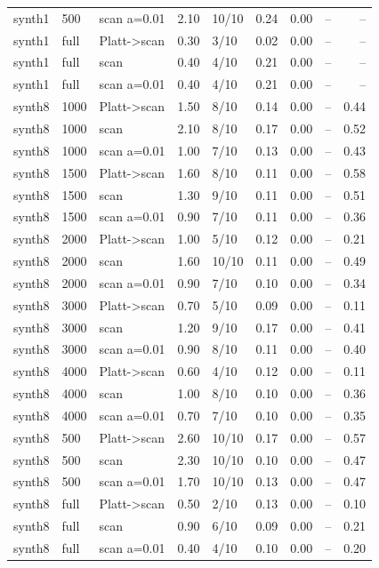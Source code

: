 \begin{tabular}{lllrlrrrr}
synth1 & 500 & scan a=0.01 & 2.10 & 10/10 & 0.24 & 0.00 & -- & -- \\
synth1 & full & Platt->scan & 0.30 & 3/10 & 0.02 & 0.00 & -- & -- \\
synth1 & full & scan & 0.40 & 4/10 & 0.21 & 0.00 & -- & -- \\
synth1 & full & scan a=0.01 & 0.40 & 4/10 & 0.21 & 0.00 & -- & -- \\
synth8 & 1000 & Platt->scan & 1.50 & 8/10 & 0.14 & 0.00 & -- & 0.44 \\
synth8 & 1000 & scan & 2.10 & 8/10 & 0.17 & 0.00 & -- & 0.52 \\
synth8 & 1000 & scan a=0.01 & 1.00 & 7/10 & 0.13 & 0.00 & -- & 0.43 \\
synth8 & 1500 & Platt->scan & 1.60 & 8/10 & 0.11 & 0.00 & -- & 0.58 \\
synth8 & 1500 & scan & 1.30 & 9/10 & 0.11 & 0.00 & -- & 0.51 \\
synth8 & 1500 & scan a=0.01 & 0.90 & 7/10 & 0.11 & 0.00 & -- & 0.36 \\
synth8 & 2000 & Platt->scan & 1.00 & 5/10 & 0.12 & 0.00 & -- & 0.21 \\
synth8 & 2000 & scan & 1.60 & 10/10 & 0.11 & 0.00 & -- & 0.49 \\
synth8 & 2000 & scan a=0.01 & 0.90 & 7/10 & 0.10 & 0.00 & -- & 0.34 \\
synth8 & 3000 & Platt->scan & 0.70 & 5/10 & 0.09 & 0.00 & -- & 0.11 \\
synth8 & 3000 & scan & 1.20 & 9/10 & 0.17 & 0.00 & -- & 0.41 \\
synth8 & 3000 & scan a=0.01 & 0.90 & 8/10 & 0.11 & 0.00 & -- & 0.40 \\
synth8 & 4000 & Platt->scan & 0.60 & 4/10 & 0.12 & 0.00 & -- & 0.11 \\
synth8 & 4000 & scan & 1.00 & 8/10 & 0.10 & 0.00 & -- & 0.36 \\
synth8 & 4000 & scan a=0.01 & 0.70 & 7/10 & 0.10 & 0.00 & -- & 0.35 \\
synth8 & 500 & Platt->scan & 2.60 & 10/10 & 0.17 & 0.00 & -- & 0.57 \\
synth8 & 500 & scan & 2.30 & 10/10 & 0.10 & 0.00 & -- & 0.47 \\
synth8 & 500 & scan a=0.01 & 1.70 & 10/10 & 0.13 & 0.00 & -- & 0.47 \\
synth8 & full & Platt->scan & 0.50 & 2/10 & 0.13 & 0.00 & -- & 0.10 \\
synth8 & full & scan & 0.90 & 6/10 & 0.09 & 0.00 & -- & 0.21 \\
synth8 & full & scan a=0.01 & 0.40 & 4/10 & 0.10 & 0.00 & -- & 0.20 \\
\bottomrule
\end{tabular}
